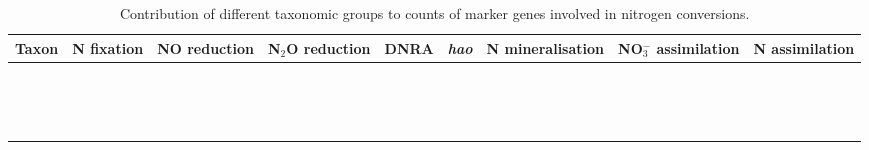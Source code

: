 \begin{table}
\footnotesize
\caption[Contribution of different taxonomic groups to counts of marker genes involved in nitrogen conversions]{Contribution of different taxonomic groups to counts of marker genes involved in nitrogen conversions.}
\label{tab:n_cycle_spc}
\smallskip
\begin{tabularx}{\textwidth}{XXXXXXXXX}
\toprule
\textbf{Taxon} & \textbf{N fixation} & \textbf{NO reduction} & \textbf{N$_2$O reduction} & \textbf{DNRA} & \textbf{\emph{hao}} & \textbf{N mineralisation} & \textbf{NO$_3^-$ assimilation} & \textbf{N assimilation}\\
\midrule
 &  &  &  &   &   &   &  &  \\
 &  &  &  &   &   &   &  &  \\
 &  &  &  &   &   &   &  &  \\
 &  &  &  &   &   &   &  &  \\
 &  &  &  &   &   &   &  &  \\
 &  &  &  &   &   &   &  &  \\
 &  &  &  &   &   &   &  &  \\
 &  &  &  &   &   &   &  &  \\
 &  &  &  &   &   &   &  &  \\
 &  &  &  &   &   &   &  &  \\
 &  &  &  &   &   &   &  &  \\
 &  &  &  &   &   &   &  &  \\
 &  &  &  &   &   &   &  &  \\
 &  &  &  &   &   &   &  &  \\
 &  &  &  &   &   &   &  &  \\
\bottomrule
\end{tabularx}
\end{table}

